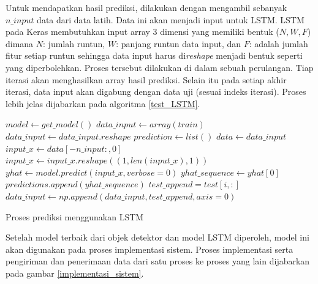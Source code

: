 \documentclass[conference]{IEEEtran}
\begin{document}
Untuk mendapatkan hasil prediksi, dilakukan dengan mengambil sebanyak $n\_input$ data dari data latih. Data ini akan menjadi input untuk LSTM. LSTM pada Keras membutuhkan input array 3 dimensi yang memiliki bentuk ($N, W, F$) dimana $N$: jumlah runtun, $W$: panjang runtun data input, dan $F$: adalah jumlah fitur setiap runtun sehingga data input harus di\textit{reshape} menjadi bentuk seperti yang diperbolehkan.
Proses tersebut dilakukan di dalam sebuah perulangan. Tiap iterasi akan menghasilkan array hasil prediksi. Selain itu pada setiap akhir iterasi, data input akan digabung dengan data uji (sesuai indeks iterasi). Proses lebih jelas dijabarkan pada algoritma \ref{test_LSTM}.
\begin{algorithm}[htp]
	\begin{algorithmic}[1]
		\State $model \leftarrow get\_model()$
		\State $data\_input \leftarrow array(train)$
		\State $data\_input \leftarrow data\_input.reshape$
		\State $prediction \leftarrow list()$
			\State $data \leftarrow data\_input$
			\State $input\_x \leftarrow data[-n\_input:,0]$
			\State $input\_x \leftarrow input\_x.reshape((1, len(input\_x), 1))$
			\State $yhat \leftarrow model.predict(input\_x, verbose=0)$
			\State $yhat\_sequence \leftarrow yhat[0]$
			\State $predictions.append(yhat\_sequence)$
			\State $test\_append = test[i, :]$
			\State $data\_input \leftarrow np.append(data\_input, test\_append, axis=0)$
		\EndFor
	\EndFunction
	\end{algorithmic}
	\caption{Proses prediksi menggunakan LSTM}
	\label{test_LSTM}
\end{algorithm}

Setelah model terbaik dari objek detektor dan model LSTM diperoleh, model ini akan digunakan pada proses implementasi sistem. Proses implementasi serta pengiriman dan penerimaan data dari satu proses ke proses yang lain dijabarkan pada gambar \ref{implementasi_sistem}.
\end{document}
